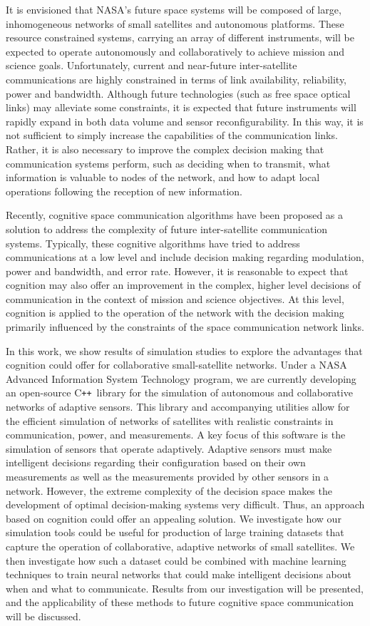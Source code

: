 \documentclass[conference]{IEEEtran}
\newcommand{\cpp}{C\texttt{++}~}
\begin{document}
It is envisioned that NASA's future space systems will be composed of large,
inhomogeneous networks of small satellites and autonomous platforms.  These
resource constrained systems, carrying an array of different instruments, will
be expected to operate autonomously and collaboratively to achieve mission and
science goals.  Unfortunately, current and near-future inter-satellite
communications are highly constrained in terms of link availability,
reliability, power and bandwidth.  Although future technologies (such as free
space optical links) may alleviate some constraints, it is expected that future
instruments will rapidly expand in both data volume and sensor
reconfigurability.  In this way, it is not sufficient to simply increase the
capabilities of the communication links.  Rather, it is also necessary to
improve the complex decision making that communication systems perform, such as
deciding when to transmit, what information is valuable to nodes of the network,
and how to adapt local operations following the reception of new information.

Recently, cognitive space communication algorithms have been proposed as a
solution to address the complexity of future inter-satellite communication
systems.  Typically, these cognitive algorithms have tried to address
communications at a low level and include decision making regarding modulation,
power and bandwidth, and error rate.  However, it is reasonable to expect that
cognition may also offer an improvement in the complex, higher level decisions
of communication in the context of mission and science objectives.  At this
level, cognition is applied to the operation of the network with the decision
making primarily influenced by the constraints of the space communication
network links.

In this work, we show results of simulation studies to explore the advantages
that cognition could offer for collaborative small-satellite networks.  Under a
NASA Advanced Information System Technology program, we are currently developing
an open-source \cpp library for the simulation of autonomous and collaborative
networks of adaptive sensors.  This library and accompanying utilities allow for
the efficient simulation of networks of satellites with realistic constraints in
communication, power, and measurements.  A key focus of this software is the
simulation of sensors that operate adaptively.  Adaptive sensors must make
intelligent decisions regarding their configuration based on their own
measurements as well as the measurements provided by other sensors in a network.
However, the extreme complexity of the decision space makes the development of
optimal decision-making systems very difficult.  Thus, an approach based on
cognition could offer an appealing solution.  We investigate how our simulation
tools could be useful for production of large training datasets that capture the
operation of collaborative, adaptive networks of small satellites.  We then
investigate how such a dataset could be combined with machine learning
techniques to train neural networks that could make intelligent decisions about
when and what to communicate.  Results from our investigation will be presented,
and the applicability of these methods to future cognitive space communication
will be discussed.
\end{document}
